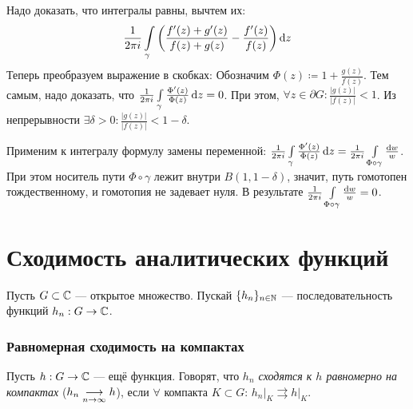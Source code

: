 \documentclass[a4paper]{report}
\begin{document}
{{    Надо доказать, что интегралы равны, вычтем их:
    \[\frac{1}{2\pi i}\int\limits_{\gamma}\left(\frac{f'(z) + g'(z)}{f(z) + g(z)} - \frac{f'(z)}{f(z)}\right)\operatorname{d}\! z\]
    Теперь преобразуем выражение в скобках:
    Обозначим $\Phi(z) \coloneqq 1 + \frac{g(z)}{f(z)}$.
    Тем самым, надо доказать, что $\frac{1}{2\pi i}\int\limits_{\gamma}\frac{\Phi'(z)}{\Phi(z)}\operatorname{d}\! z = 0$.
    При этом, $\forall z \in \partial G: \frac{|g(z)|}{|f(z)|} < 1$.
        Из непрерывности $\exists \delta > 0: \frac{|g(z)|}{|f(z)|} < 1 - \delta$.

    Применим к интегралу формулу замены переменной: $\frac{1}{2\pi i}\int\limits_{\gamma}\frac{\Phi'(z)}{\Phi(z)}\operatorname{d}\! z = \frac{1}{2\pi i}\int\limits_{\Phi \circ \gamma} \frac{\operatorname{d}\! w}{w}$.
    При этом носитель пути $\Phi \circ \gamma$ лежит внутри $B(1, 1 - \delta)$, значит, путь гомотопен тождественному, и гомотопия не задевает нуля.
    В результате $\frac{1}{2\pi i}\int\limits_{\Phi \circ \gamma} \frac{\operatorname{d}\! w}{w} = 0$.
    }
    }
    \section{Сходимость аналитических функций}
    Пусть $G \subset \mathbb{C}$ --- открытое множество.
    Пускай $\{h_n\}_{n \in \mathbb{N}}$ --- последовательность функций $h_n: G \rightarrow \mathbb{C}$.
    \subsubsection{Равномерная сходимость на компактах}
    Пусть $h: G \rightarrow \mathbb{C}$ --- ещё функция.
    Говорят, что \emph{$h_n$ сходятся к $h$ равномерно на компактах} ($h_n \underset{n \to \infty}{\longrightarrow} h$), если $\forall$ компакта $K \subset G$: $h_n\big|_K \rightrightarrows h\big|_K$.
\end{document}
